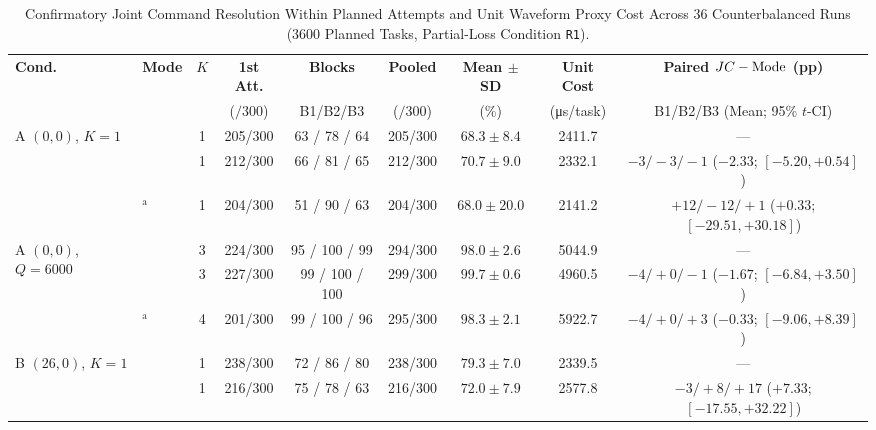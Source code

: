 \begin{table}[t]
\centering
\caption{Confirmatory Joint Command Resolution Within Planned Attempts and Unit Waveform Proxy Cost Across 36 Counterbalanced Runs (\num{3600} Planned Tasks, Partial-Loss Condition \texttt{R1}).}
\label{tab:p4_main}
\setlength{\tabcolsep}{3.1pt}
\footnotesize
\begin{tabular}{@{}llccccccc@{}}
\toprule
\textbf{Cond.} & \textbf{Mode} & $K$ & \textbf{1st Att.} & \textbf{Blocks} & \textbf{Pooled} & \textbf{Mean $\pm$ SD} & \textbf{Unit Cost} & \textbf{Paired $JC{} - \text{Mode}$ (pp)} \\
 & & & ($/300$) & B1/B2/B3 & ($/300$) & (\%) & (\si{\micro\second}/task) & B1/B2/B3 (Mean; 95\% $t$-CI) \\
\midrule
\multirow{3}{*}{A $(0,0)$, $K{=}1$}
  & \modejc{}              & 1 & 205/300 & 63 / 78 / 64 & 205/300 & $68.3 \pm 8.4$  & \num{2411.7}  & --- \\
  & \modesc{}              & 1 & 212/300 & 66 / 81 / 65 & 212/300 & $70.7 \pm 9.0$  & \num{2332.1}  & $-3/{-}3/{-}1$ ($-2.33$; $[-5.20, +0.54]$) \\
  & \modelc{}$^{\mathrm{a}}$ & 1 & 204/300 & 51 / 90 / 63 & 204/300 & $68.0 \pm 20.0$ & \num{2141.2}  & $+12/{-}12/{+}1$ ($+0.33$; $[-29.51, +30.18]$) \\
\midrule
\multirow{3}{*}{A $(0,0)$, $Q{=}6000$}
  & \modejc{}              & 3 & 224/300 & 95 / 100 / 99  & 294/300 & $98.0 \pm 2.6$ & \num{5044.9}  & --- \\
  & \modesc{}              & 3 & 227/300 & 99 / 100 / 100 & 299/300 & $99.7 \pm 0.6$ & \num{4960.5}  & $-4/{+}0/{-}1$ ($-1.67$; $[-6.84, +3.50]$) \\
  & \modelc{}$^{\mathrm{a}}$ & 4 & 201/300 & 99 / 100 / 96  & 295/300 & $98.3 \pm 2.1$ & \num{5922.7}  & $-4/{+}0/{+}3$ ($-0.33$; $[-9.06, +8.39]$) \\
\midrule
\multirow{3}{*}{B $(26,0)$, $K{=}1$}
  & \modejc{}              & 1 & 238/300 & 72 / 86 / 80 & 238/300 & $79.3 \pm 7.0$  & \num{2339.5}  & --- \\
  & \modesc{}              & 1 & 216/300 & 75 / 78 / 63 & 216/300 & $72.0 \pm 7.9$  & \num{2577.8}  & $-3/{+}8/{+}17$ ($+7.33$; $[-17.55, +32.22]$) \\

\end{tabular}
\end{table}
